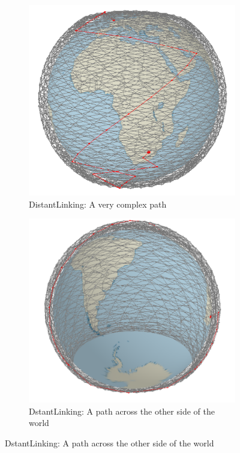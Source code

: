 \documentclass[12pt,a4paper,twoside,openright]{report}
\begin{document}
\begin{figure}
	\begin{subfigure}[b]{0.4\textwidth}
		\caption{DistantLinking: A very complex path}
		\includegraphics[width=\textwidth]{LDN-JHB-DistL-1}
	\end{subfigure}
	\hfill
	\begin{subfigure}[b]{0.4\textwidth}
		\caption{DstantLinking: A path across the other side of the world}
		\includegraphics[width=\textwidth]{LDN-JHB-DistL-2}
	\end{subfigure}
\end{figure}
\end{document}
